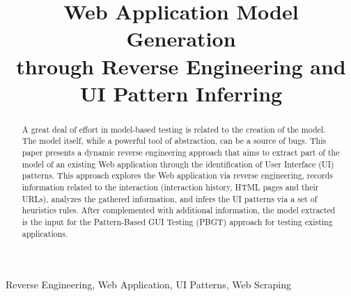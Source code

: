 \documentclass[conference]{IEEEtran}
\begin{document}
%
\title{Web Application Model Generation \\through Reverse Engineering and UI Pattern Inferring}

\author{
\and
{}
}



\maketitle

\begin{abstract}
A great deal of effort in model-based testing is related to the creation of the model. The model itself, while a powerful tool of abstraction, can be a source of bugs. This paper presents a dynamic reverse engineering approach that aims to extract part of the model of an existing Web application through the identification of User Interface (UI) patterns. This approach explores the Web application via reverse engineering, records information related to the interaction (interaction history, HTML pages and their URLs), analyzes the gathered information, and infers the UI patterns via a set of heuristics rules. After complemented with additional information, the model extracted is the input for the Pattern-Based GUI Testing (PBGT) approach for testing existing applications.
\end{abstract}
\begin{IEEEkeywords} Reverse Engineering, Web Application, UI Patterns, Web Scraping \end{IEEEkeywords}
\end{document}
